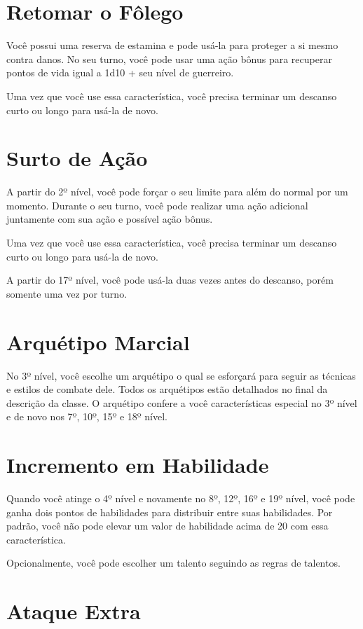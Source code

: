 \begin{multicols}{2}
\section*{Retomar o Fôlego}%

Você possui uma reserva de estamina e pode usá-la para proteger a si mesmo
contra danos. No seu turno, você pode usar uma ação bônus para recuperar pontos
de vida igual a 1d10 + seu nível de guerreiro.

Uma vez que você use essa característica, você precisa terminar um descanso
curto ou longo para usá-la de novo.

\section*{Surto de Ação}%

A partir do 2º nível, você pode forçar o seu limite para além do normal por um
momento. Durante o seu turno, você pode realizar uma ação adicional juntamente
com sua ação e possível ação bônus.

Uma vez que você use essa característica, você precisa terminar um descanso
curto ou longo para usá-la de novo.

A partir do 17º nível, você pode usá-la duas vezes antes do descanso, porém
somente uma vez por turno.

\section*{Arquétipo Marcial}%

No 3º nível, você escolhe um arquétipo o qual se esforçará para seguir as
técnicas e estilos de combate dele. Todos os arquétipos estão detalhados no
final da descrição da classe. O arquétipo confere a você características
especial no 3º nível e de novo nos 7º, 10º, 15º e 18º nível.

\section*{Incremento em Habilidade}%

Quando você atinge o 4º nível e novamente no 8º, 12º, 16º e 19º nível, você pode
ganha dois pontos de habilidades para distribuir entre suas habilidades. Por
padrão, você não pode elevar um valor de habilidade acima de 20 com essa
característica.

Opcionalmente, você pode escolher um talento seguindo as regras de talentos.

\section*{Ataque Extra}%


\end{multicols}
